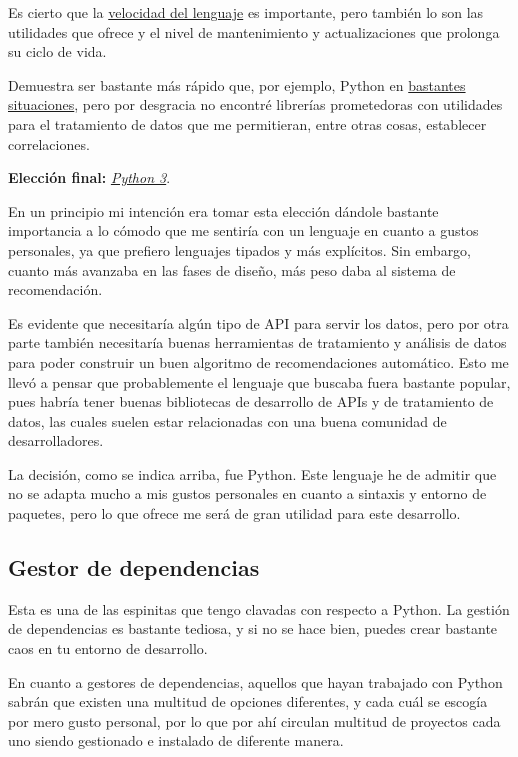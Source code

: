 Es cierto que la \href{https://benchmarksgame-team.pages.debian.net/benchmarksgame/index.html}{velocidad del lenguaje} es importante, pero también lo son las utilidades que ofrece y el nivel de mantenimiento y actualizaciones que prolonga su ciclo de vida.

Demuestra ser bastante más rápido que, por ejemplo, Python en \href{https://benchmarksgame-team.pages.debian.net/benchmarksgame/fastest/go-python3.html}{bastantes situaciones}, pero por desgracia no encontré librerías prometedoras con utilidades para el tratamiento de datos que me permitieran, entre otras cosas, establecer correlaciones.

\textbf{Elección final:} \href{https://www.python.org/}{\textit{Python 3}}.

En un principio mi intención era tomar esta elección dándole bastante importancia a lo cómodo que me sentiría con un lenguaje en cuanto a gustos personales, ya que prefiero lenguajes tipados y más explícitos. Sin embargo, cuanto más avanzaba en las fases de diseño, más peso daba al sistema de recomendación. 

Es evidente que necesitaría algún tipo de API para servir los datos, pero por otra parte también necesitaría buenas herramientas de tratamiento y análisis de datos para poder construir un buen algoritmo de recomendaciones automático. Esto me llevó a pensar que probablemente el lenguaje que buscaba fuera bastante popular, pues habría tener buenas bibliotecas de desarrollo de APIs y de tratamiento de datos, las cuales suelen estar relacionadas con una buena comunidad de desarrolladores.

La decisión, como se indica arriba, fue Python. Este lenguaje he de admitir que no se adapta mucho a mis gustos personales en cuanto a sintaxis y entorno de paquetes, pero lo que ofrece me será de gran utilidad para este desarrollo.

\subsection{Gestor de dependencias}

Esta es una de las espinitas que tengo clavadas con respecto a Python. La gestión de dependencias es bastante tediosa, y si no se hace bien, puedes crear bastante caos en tu entorno de desarrollo.

En cuanto a gestores de dependencias, aquellos que hayan trabajado con Python sabrán que existen una multitud de opciones diferentes, y cada cuál se escogía por mero gusto personal, por lo que por ahí circulan multitud de proyectos cada uno siendo gestionado e instalado de diferente manera.

